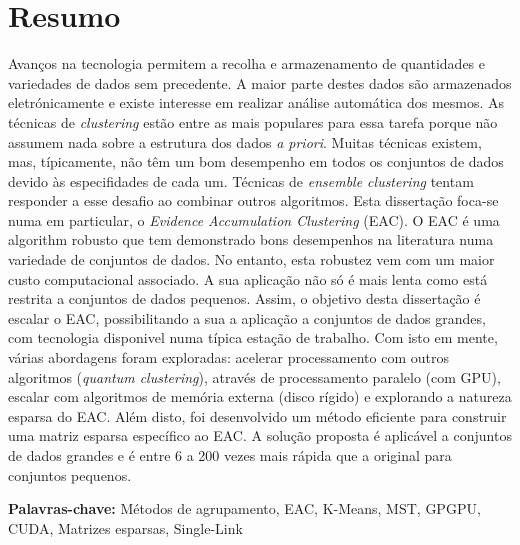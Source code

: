 
\section*{Resumo}


Avanços na tecnologia permitem a recolha e armazenamento de quantidades e variedades de dados sem precedente.
A maior parte destes dados são armazenados eletrónicamente e existe interesse em realizar análise automática dos mesmos.
As técnicas de \emph{clustering} estão entre as mais populares para essa tarefa porque não assumem nada sobre a estrutura dos dados \emph{a priori}.
Muitas técnicas existem, mas, típicamente, não têm um bom desempenho em todos os conjuntos de dados devido às especifidades de cada um.
Técnicas de \emph{ensemble clustering} tentam responder a esse desafio ao combinar outros algoritmos.
Esta dissertação foca-se numa em particular, o \emph{Evidence Accumulation Clustering} (EAC).
O EAC é uma algorithm robusto que tem demonstrado bons desempenhos na literatura numa variedade de conjuntos de dados.
No entanto, esta robustez vem com um maior custo computacional associado.
A sua aplicação não só é mais lenta como está restrita a conjuntos de dados pequenos.
Assim, o objetivo desta dissertação é escalar o EAC, possibilitando a sua a aplicação a conjuntos de dados grandes, com tecnologia disponivel numa típica estação de trabalho.
Com isto em mente, várias abordagens foram exploradas: acelerar processamento com outros algoritmos (\emph{quantum clustering}), através de processamento paralelo (com GPU), escalar com algoritmos de memória externa (disco rígido) e explorando a natureza esparsa do EAC.
Além disto, foi desenvolvido um método eficiente para construir uma matriz esparsa específico ao EAC.
A solução proposta é aplicável a conjuntos de dados grandes e é entre 6 a 200 vezes mais rápida que a original para conjuntos pequenos.

\vfill

\textbf{\Large Palavras-chave:} Métodos de agrupamento, EAC, K-Means, MST, GPGPU, CUDA, Matrizes esparsas, Single-Link

\cleardoublepage

